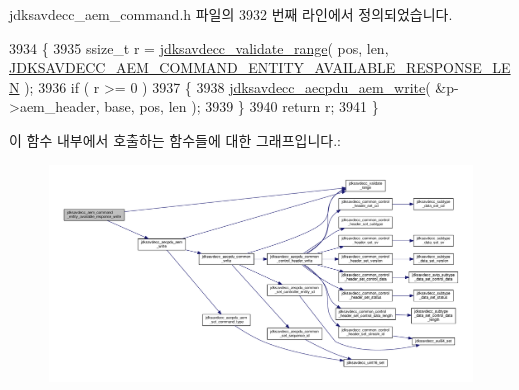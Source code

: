 jdksavdecc\+\_\+aem\+\_\+command.\+h 파일의 3932 번째 라인에서 정의되었습니다.


\begin{DoxyCode}
3934 \{
3935     ssize\_t r = \hyperlink{group__util_ga9c02bdfe76c69163647c3196db7a73a1}{jdksavdecc\_validate\_range}( pos, len, 
      \hyperlink{group__command__entity__available__response_gac62890c7584a06eb4c3e18d082690e5b}{JDKSAVDECC\_AEM\_COMMAND\_ENTITY\_AVAILABLE\_RESPONSE\_LEN} );
3936     \textcolor{keywordflow}{if} ( r >= 0 )
3937     \{
3938         \hyperlink{group__aecpdu__aem_gad658e55771cce77cecf7aae91e1dcbc5}{jdksavdecc\_aecpdu\_aem\_write}( &p->aem\_header, base, pos, len );
3939     \}
3940     \textcolor{keywordflow}{return} r;
3941 \}
\end{DoxyCode}


이 함수 내부에서 호출하는 함수들에 대한 그래프입니다.\+:
\nopagebreak
\begin{figure}[H]
\begin{center}
\leavevmode
\includegraphics[width=350pt]{group__command__entity__available__response_ga922b8b3665d1f82eb9af0fbbd1f9ad99_cgraph}
\end{center}
\end{figure}


